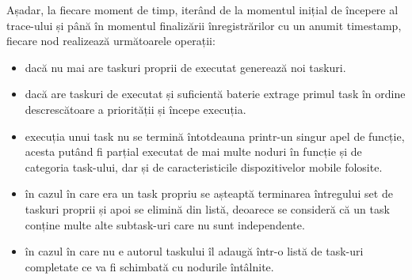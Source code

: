 \documentclass[12pt,a4paper]{report}
\begin{document}
Așadar, la fiecare moment de timp, iterând de la momentul inițial de începere al trace-ului și până în momentul finalizării înregistrărilor cu un anumit timestamp, fiecare nod realizează următoarele operații:
\begin{itemize}
	\item dacă nu mai are taskuri proprii de executat generează noi taskuri.
	\item dacă are taskuri de executat și suficientă baterie extrage primul task în ordine descrescătoare a priorității și începe execuția.
	\item execuția unui task nu se termină întotdeauna printr-un singur apel de funcție, acesta putând fi parțial executat de mai multe noduri în funcție și de categoria task-ului, dar și de caracteristicile dispozitivelor mobile folosite.
	\item în cazul în care era un task propriu se așteaptă terminarea întregului set de taskuri proprii și apoi se elimină din listă, deoarece se consideră că un task conține multe alte subtask-uri care nu sunt independente.
	\item în cazul în care nu e autorul taskului îl adaugă într-o listă de task-uri completate ce va fi schimbată cu nodurile întâlnite.
\end{itemize}
\end{document}

